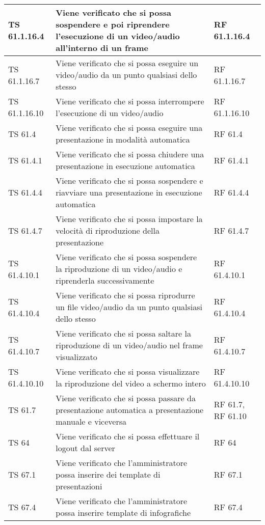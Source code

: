 {{\begin{longtable} [c]{| p{3cm} | p{6cm} |p{3cm}|}
			\hline
			TS 61.1.16.4 & Viene verificato che si possa sospendere\ped{g} e poi riprendere l'esecuzione di un video/audio all'interno di un frame\ped{g} & RF 61.1.16.4\\
			\hline
			TS 61.1.16.7 & Viene verificato che si possa eseguire un video/audio da un punto qualsiasi dello stesso & RF 61.1.16.7\\
			\hline
			TS 61.1.16.10 & Viene verificato che si possa interrompere l'esecuzione di un video/audio & RF 61.1.16.10\\
			\hline
			TS 61.4 & Viene verificato che si possa eseguire una presentazione in modalità automatica & RF 61.4\\
			\hline
			TS 61.4.1 & Viene verificato che si possa chiudere una presentazione in esecuzione automatica & RF 61.4.1\\
			\hline
			TS 61.4.4 & Viene verificato che si possa sospendere\ped{g} e riavviare una presentazione in esecuzione automatica & RF 61.4.4\\
			\hline
			TS 61.4.7 & Viene verificato che si possa impostare la velocità di riproduzione della presentazione & RF 61.4.7\\
			\hline
			TS 61.4.10.1 & Viene verificato che si possa sospendere la riproduzione di un video/audio e riprenderla successivamente & RF 61.4.10.1\\
			\hline
			TS 61.4.10.4 & Viene verificato che si possa riprodurre un file video/audio da un punto qualsiasi dello stesso & RF 61.4.10.4\\
			\hline
			TS 61.4.10.7 & Viene verificato che si possa saltare la riproduzione di un video/audio nel frame\ped{g} visualizzato & RF 61.4.10.7\\
			\hline
			TS 61.4.10.10 & Viene verificato che si possa visualizzare la riproduzione del video a schermo intero & RF 61.4.10.10\\
			\hline
			TS 61.7 & Viene verificato che si possa passare da presentazione automatica a presentazione manuale e viceversa & RF 61.7, RF 61.10\\
			\hline
			TS 64 & Viene verificato che si possa effettuare il logout\ped{g} dal server\ped{g} & RF 64\\
			\hline
			TS 67.1 & Viene verificato che l'amministratore possa inserire dei template\ped{g} di presentazioni & RF 67.1\\
			\hline
			TS 67.4 & Viene verificato che l'amministratore possa inserire template\ped{g} di infografiche\ped{g} & RF 67.4\\

\end{longtable}}}
